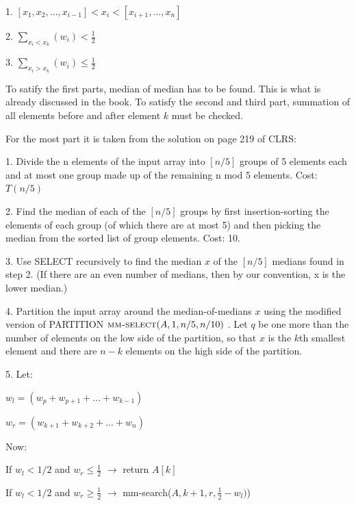 \documentclass[11pt]{article}
\begin{document}
\begin{enumerate}
	\hspace{10mm} 1. $[x_1, x_2,...,x_{i-1}]<x_i<[x_{i+1},...,x_{n}]$

	\hspace{10mm} 2. $\sum_{x_i<x_k}^{} (w_i)<\frac{1}{2}$

	\hspace{10mm} 3. $\sum_{x_i>x_k}^{} (w_i)\leq\frac{1}{2}$
	
	To satify the first parts, median of median has to be found. This is what is already discussed in the book. To satisfy the second and third part,  summation of all elements before and after element $k$ must be checked. 

	For the most part it is taken from the solution on page 219 of CLRS:

	1. Divide the n elements of the input array into $[n/5]$ groups of 5 elements each
and at most one group made up of the remaining n mod 5 elements. Cost:$T(n/5)$

	2. Find the median of each of the $[n/5]$ groups by first insertion-sorting the elements of each group (of which there are at most 5) and then picking the median
from the sorted list of group elements. Cost: 10.

	3. Use SELECT recursively to find the median $x$ of the $[n/5]$ medians found in
step 2. (If there are an even number of medians, then by our convention, x is
the lower median.)

	4. Partition the input array around the median-of-medians $x$ using the modified
version of PARTITION $\textnormal{\scshape mm-select}(A,1,n/5,n/10)$ . Let $q$ be one more than the number of elements on the low side of the partition, so that $x$ is the $k$th smallest element and there are $n-k$ elements on the high side of the partition.

	5. Let: 
	
	\hspace{10mm} $w_{l} = (w_{p}+w_{p+1}+...+w_{k-1})$

	\hspace{10mm} $w_{r} = (w_{k+1}+w_{k+2}+...+w_{n})$
	
	\hspace{10mm} Now: 
	
	\hspace{10mm} If $w_{l}<1/2$ and $w_{r} \leq \frac{1}{2}$ $\longrightarrow$ return $A[k]$
	
	\hspace{10mm} If $w_{l}<1/2$ and $w_{r} \geq \frac{1}{2}$ $\longrightarrow$	mm-search($A,k+1,r,\frac{1}{2}-w_{l})$)
	

\end{enumerate}
\end{document}
